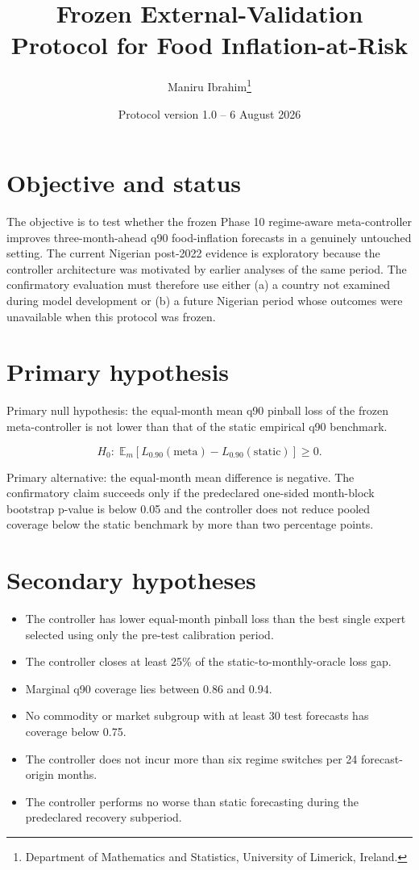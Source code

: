 \documentclass[11pt,a4paper]{article}
\title{Frozen External-Validation Protocol for Food Inflation-at-Risk}
\author{Maniru Ibrahim\thanks{Department of Mathematics and Statistics,
University of Limerick, Ireland.}}
\date{Protocol version 1.0 -- 6 August 2026}
\begin{document}
\maketitle

\section{Objective and status}\label{objective-and-status}

The objective is to test whether the frozen Phase 10 regime-aware
meta-controller improves three-month-ahead q90 food-inflation forecasts
in a genuinely untouched setting. The current Nigerian post-2022
evidence is exploratory because the controller architecture was
motivated by earlier analyses of the same period. The confirmatory
evaluation must therefore use either (a) a country not examined during
model development or (b) a future Nigerian period whose outcomes were
unavailable when this protocol was frozen.

\section{Primary hypothesis}\label{primary-hypothesis}

Primary null hypothesis: the equal-month mean q90 pinball loss of the
frozen meta-controller is not lower than that of the static empirical
q90 benchmark.

\[
H_0:\;\mathbb{E}_m\left[L_{0.90}(\mathrm{meta})-L_{0.90}(\mathrm{static})\right]\geq 0.
\]

Primary alternative: the equal-month mean difference is negative. The
confirmatory claim succeeds only if the predeclared one-sided
month-block bootstrap p-value is below 0.05 and the controller does not
reduce pooled coverage below the static benchmark by more than two
percentage points.

\section{Secondary hypotheses}\label{secondary-hypotheses}

\begin{itemize}
\item The controller has lower equal-month pinball loss than the best single expert selected using only the pre-test calibration period.
\item The controller closes at least 25\% of the static-to-monthly-oracle loss gap.
\item Marginal q90 coverage lies between 0.86 and 0.94.
\item No commodity or market subgroup with at least 30 test forecasts has coverage below 0.75.
\item The controller does not incur more than six regime switches per 24 forecast-origin months.
\item The controller performs no worse than static forecasting during the predeclared recovery subperiod.
\end{itemize}
\end{document}
